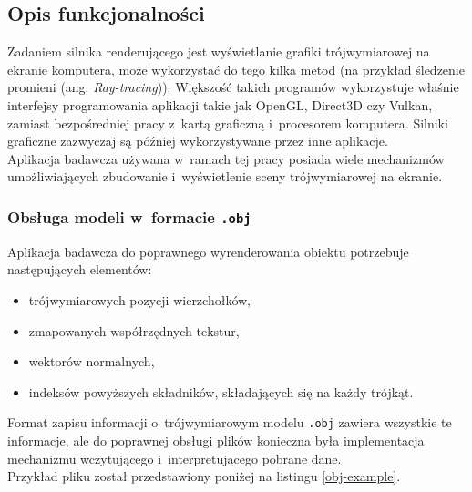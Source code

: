 \documentclass[a4paper,twoside,12pt]{book}
\newcommand{\obcy}[1]{\emph{#1}}
\newcommand{\ang}[1]{{\selectlanguage{british}\obcy{#1}}}
\begin{document}
\subsection{Opis funkcjonalności}
Zadaniem silnika renderującego jest wyświetlanie grafiki trójwymiarowej na ekranie komputera, może wykorzystać do tego kilka metod (na przykład śledzenie promieni (ang. \ang{Ray-tracing})). Większość takich programów wykorzystuje właśnie interfejsy programowania aplikacji takie jak OpenGL, Direct3D czy Vulkan, zamiast bezpośredniej pracy z~kartą graficzną i~procesorem komputera. Silniki graficzne zazwyczaj są później wykorzystywane przez inne aplikacje. \\
Aplikacja badawcza używana w~ramach tej pracy posiada wiele mechanizmów umożliwiających zbudowanie i~wyświetlenie sceny trójwymiarowej na ekranie.

\subsubsection{Obsługa modeli w~formacie \texttt{.obj}}
Aplikacja badawcza do poprawnego wyrenderowania obiektu potrzebuje następujących elementów:
\begin{itemize}
    \item trójwymiarowych pozycji wierzchołków,
    \item zmapowanych współrzędnych tekstur,
    \item wektorów normalnych,
    \item indeksów powyższych składników, składających się na każdy trójkąt.
\end{itemize}
Format zapisu informacji o~trójwymiarowym modelu \texttt{.obj} zawiera wszystkie te informacje, ale do poprawnej obsługi plików konieczna była implementacja mechanizmu wczytującego i~interpretującego pobrane dane. \\ Przykład pliku został przedstawiony poniżej na listingu \ref{obj-example}.


\end{document}
